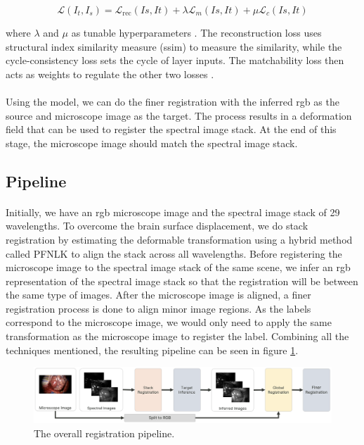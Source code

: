 \documentclass[12pt,oneside]{report}
\begin{document}
\begin{equation}
    \mathcal{L}(I_t, I_s) = 
    \mathcal{L}_{\text{rec}}(Is, It) +
    \lambda \mathcal{L}_m (Is, It) +
    \mu \mathcal{L}_c (Is, It)
\end{equation}

where $\lambda$ and $\mu$ as tunable hyperparameters \cite{shen_ransac-flow_2020}. The reconstruction loss uses structural index similarity measure (\acrshort{ssim}) \cite{wang_image_2004} to measure the similarity, while the cycle-consistency loss sets the cycle of layer inputs. The matchability loss then acts as weights to regulate the other two losses \cite{shen_ransac-flow_2020}.

\paragraph{}
Using the model, we can do the finer registration with the inferred \acrshort{rgb} as the source and microscope image as the target. The process results in a deformation field that can be used to register the spectral image stack. At the end of this stage, the microscope image should match the spectral image stack.


\subsection{Pipeline}
\paragraph{}
Initially, we have an \acrshort{rgb} microscope image and the spectral image stack of 29 wavelengths. To overcome the brain surface displacement, we do stack registration by estimating the deformable transformation using a hybrid method called PFNLK to align the stack across all wavelengths. Before registering the microscope image to the spectral image stack of the same scene, we infer an \acrshort{rgb} representation of the spectral image stack so that the registration will be between the same type of images. After the microscope image is aligned, a finer registration process is done to align minor image regions. As the labels correspond to the microscope image, we would only need to apply the same transformation as the microscope image to register the label. Combining all the techniques mentioned, the resulting pipeline can be seen in figure \ref{fig:pipeline}.

\vspace{0.2cm}
\begin{figure}[h]
\centering
\begin{minipage}[h]{\textwidth}
    \centering
    \includegraphics[width=\textwidth]{figures/pipeline.png}
    \caption{The overall registration pipeline.}
    \label{fig:pipeline}
\end{minipage}
\end{figure}
\end{document}
